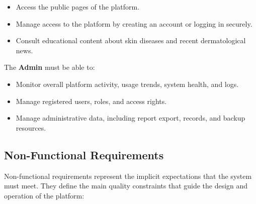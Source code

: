 	\begin{itemize}
	  \item Access the public pages of the platform.
	  \item Manage access to the platform by creating an account or logging in securely.
	  \item Consult educational content about skin diseases and recent dermatological news.
	\end{itemize}
	
	The \textbf{Admin} must be able to:
	
	\begin{itemize}
	  \item Monitor overall platform activity, usage trends, system health, and logs.
	  \item Manage registered users, roles, and access rights.
	  \item Manage administrative data, including report export, records, and backup
	        resources.
	\end{itemize}
	
	\subsection{Non-Functional Requirements}
	
	Non-functional requirements represent the implicit expectations that the system must meet.
	They define the main quality constraints that guide the design and operation of the
	platform:
	
